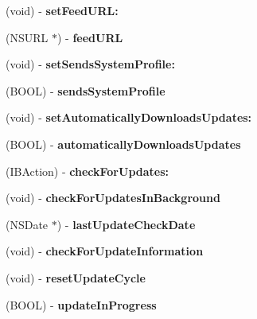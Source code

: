 \begin{DoxyCompactItemize}
(void) -\/ {\bfseries set\+Feed\+U\+R\+L\+:}
\item 
\mbox{\label{interface_s_u_updater_ae6c1445bd69ebb04874f7bef86a869f7}} 
(N\+S\+U\+RL $\ast$) -\/ {\bfseries feed\+U\+RL}
\item 
\mbox{\label{interface_s_u_updater_a0172c3a00dd9f4d1bea7e565f4a0677d}} 
(void) -\/ {\bfseries set\+Sends\+System\+Profile\+:}
\item 
\mbox{\label{interface_s_u_updater_a993b24444f00a8834600cf0ccdc6fca0}} 
(B\+O\+OL) -\/ {\bfseries sends\+System\+Profile}
\item 
\mbox{\label{interface_s_u_updater_afbe0599644f4d64e807728b3863116b7}} 
(void) -\/ {\bfseries set\+Automatically\+Downloads\+Updates\+:}
\item 
\mbox{\label{interface_s_u_updater_a40b5d37d68f0607ae602c75aa171ead9}} 
(B\+O\+OL) -\/ {\bfseries automatically\+Downloads\+Updates}
\item 
\mbox{\label{interface_s_u_updater_a283c6354fb1c1f7a853f0b2871d79802}} 
(I\+B\+Action) -\/ {\bfseries check\+For\+Updates\+:}
\item 
\mbox{\label{interface_s_u_updater_abdb91f3abfe5f06bcef7d92d21e60962}} 
(void) -\/ {\bfseries check\+For\+Updates\+In\+Background}
\item 
\mbox{\label{interface_s_u_updater_a340afae2e8f5e31bc614ebbd39b16796}} 
(N\+S\+Date $\ast$) -\/ {\bfseries last\+Update\+Check\+Date}
\item 
\mbox{\label{interface_s_u_updater_a30b1f73644272e79aa653ddfc6cf7c92}} 
(void) -\/ {\bfseries check\+For\+Update\+Information}
\item 
\mbox{\label{interface_s_u_updater_acf7fce45848ddc896467b9ba3af3578b}} 
(void) -\/ {\bfseries reset\+Update\+Cycle}
\item 
\mbox{\label{interface_s_u_updater_ac9b96e237f0aae2f2b5fe773eea32925}} 
(B\+O\+OL) -\/ {\bfseries update\+In\+Progress}
\end{DoxyCompactItemize}
